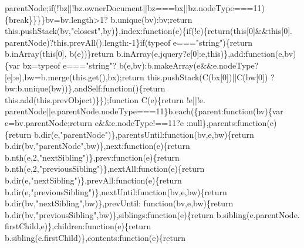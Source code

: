 \begin{DoxyCode}
{      parentNode;\textcolor{keywordflow}{if}(!bz||!bz.ownerDocument||bz===bx||bz.nodeType===11)\{\textcolor{keywordflow}{break}\}\}\}\}bv=bv.length>1?
      b.unique(bv):bv;\textcolor{keywordflow}{return} this.pushStack(bv,\textcolor{stringliteral}{"closest"},by)\},index:\textcolor{keyword}{function}(e)\{\textcolor{keywordflow}{if}(!e)\{\textcolor{keywordflow}{return}(\textcolor{keyword}{this}[0]&&\textcolor{keyword}{this}[0].
      parentNode)?this.prevAll().length:-1\}\textcolor{keywordflow}{if}(typeof e===\textcolor{stringliteral}{"string"})\{\textcolor{keywordflow}{return} b.inArray(\textcolor{keyword}{this}[0],
      b(e))\}\textcolor{keywordflow}{return} b.inArray(e.jquery?e[0]:e,\textcolor{keyword}{this})\},add:\textcolor{keyword}{function}(e,bv)\{var bx=typeof e===\textcolor{stringliteral}{"string"}?
      b(e,bv):b.makeArray(e&&e.nodeType?[e]:e),bw=b.merge(this.get(),bx);\textcolor{keywordflow}{return} this.pushStack(C(bx[0])||C(bw[0])
      ?bw:b.unique(bw))\},andSelf:\textcolor{keyword}{function}()\{\textcolor{keywordflow}{return} this.add(this.prevObject)\}\});\textcolor{keyword}{function} C(e)\{\textcolor{keywordflow}{return} !e||!e.
      parentNode||e.parentNode.nodeType===11\}b.each(\{parent:\textcolor{keyword}{function}(bv)\{var e=bv.parentNode;\textcolor{keywordflow}{return} e&&e.nodeType!==11?e
      :null\},parents:\textcolor{keyword}{function}(e)\{\textcolor{keywordflow}{return} b.dir(e,\textcolor{stringliteral}{"parentNode"})\},parentsUntil:\textcolor{keyword}{function}(bv,e,bw)\{\textcolor{keywordflow}{return} 
      b.dir(bv,\textcolor{stringliteral}{"parentNode"},bw)\},next:\textcolor{keyword}{function}(e)\{\textcolor{keywordflow}{return} b.nth(e,2,\textcolor{stringliteral}{"nextSibling"})\},prev:\textcolor{keyword}{function}(e)\{\textcolor{keywordflow}{return} 
      b.nth(e,2,\textcolor{stringliteral}{"previousSibling"})\},nextAll:\textcolor{keyword}{function}(e)\{\textcolor{keywordflow}{return} b.dir(e,\textcolor{stringliteral}{"nextSibling"})\},prevAll:\textcolor{keyword}{function}(e)\{\textcolor{keywordflow}{return}
       b.dir(e,\textcolor{stringliteral}{"previousSibling"})\},nextUntil:\textcolor{keyword}{function}(bv,e,bw)\{\textcolor{keywordflow}{return} b.dir(bv,\textcolor{stringliteral}{"nextSibling"},bw)\},prevUntil:\textcolor{keyword}{
      function}(bv,e,bw)\{\textcolor{keywordflow}{return} b.dir(bv,\textcolor{stringliteral}{"previousSibling"},bw)\},siblings:\textcolor{keyword}{function}(e)\{\textcolor{keywordflow}{return} b.sibling(e.parentNode.
      firstChild,e)\},children:\textcolor{keyword}{function}(e)\{\textcolor{keywordflow}{return} b.sibling(e.firstChild)\},contents:\textcolor{keyword}{function}(e)\{\textcolor{keywordflow}{return} 
}
\end{DoxyCode}
